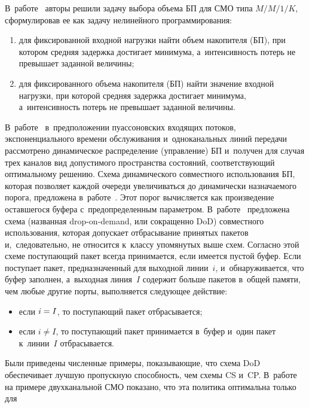 \begin{multicols}{2}
 В~работе~\cite{9-ag} авторы решили задачу выбора объема БП для 
СМО типа $M/M/1/K$, сформулировав ее как задачу нелинейного 
программирования:
\begin{enumerate}[(1)]
\item для фиксированной вход\-ной на\-груз\-ки найти объем 
накопителя (БП), при котором сред\-няя за\-держ\-ка достигает минимума, 
а~ин\-тен\-сив\-ность потерь не превышает заданной величины; 
\item для 
фиксированного объема накопителя (БП) найти значение входной на\-груз\-ки, 
при которой сред\-няя задержка достигает минимума, а~ин\-тен\-сив\-ность 
потерь не превышает заданной величины.
\end{enumerate}

 В~работе~\cite{10-ag} 
в~предположении пуассоновских входящих потоков, экспоненциального времени 
обслуживания и~одноканальных линий передачи рас\-смот\-ре\-но динамическое 
распределение (управ\-ле\-ние) БП и~получен для случая трех каналов вид 
до\-пус\-ти\-мо\-го пространства со\-сто\-яний, со\-от\-вет\-ст\-ву\-ющий оптимальному 
решению. Схема динамического совместного использования БП, которая 
поз\-во\-ля\-ет каж\-дой очереди увеличиваться до динамически на\-зна\-ча\-емо\-го порога, 
предложена в~работе~\cite{11-ag}. Этот порог вы\-чис\-ля\-ет\-ся как произведение 
остав\-ше\-го\-ся буфера с~предопределенным па\-ра\-мет\-ром. В~работе~\cite{12-ag} 
пред\-ло\-же\-на схема (названная drop-on-demand, или сокращенно DoD) 
совместного использования, которая до\-пус\-ка\-ет отбрасывание принятых 
пакетов и,~следовательно, не относится к~классу упомянутых выше схем. 
Согласно этой схеме по\-сту\-па\-ющий пакет всегда принимается, если имеется 
пус\-той буфер. Если по\-сту\-па\-ет пакет, пред\-на\-зна\-чен\-ный для выходной 
линии~$i$, и~обнаруживается, что буфер заполнен, а~вы\-ход\-ная линия~$I$ 
содержит больше пакетов в~общей памяти, чем любые другие пор\-ты, 
выполняется сле\-ду\-ющее действие: 
\begin{itemize}
\item если $i\hm=I$, то по\-сту\-па\-ющий пакет 
отбрасывается; 
\item если $i\not= I$, то по\-сту\-па\-ющий пакет принимается в~буфер 
и~один пакет к~линии~$I$ отбрасывается.
\end{itemize}
 Были приведены чис\-лен\-ные 
примеры, по\-ка\-зы\-ва\-ющие, что схема DoD обеспечивает луч\-шую пропускную 
спо\-соб\-ность, чем схемы CS и~CP. В~работе~\cite{13-ag} на примере 
двухканальной СМО показано, что эта политика оптимальна только для 

\end{multicols}
